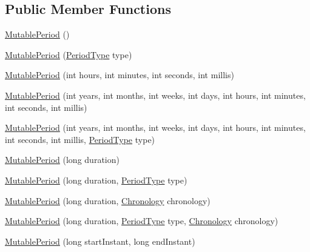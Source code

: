 \subsection*{Public Member Functions}
\begin{DoxyCompactItemize}
\item 
\hyperlink{classorg_1_1joda_1_1time_1_1_mutable_period_ad3e7fe2eb90d73aa1ce10e2feaebd445}{Mutable\-Period} ()
\item 
\hyperlink{classorg_1_1joda_1_1time_1_1_mutable_period_abecb6476e8d11e3e1440523c368b28ea}{Mutable\-Period} (\hyperlink{classorg_1_1joda_1_1time_1_1_period_type}{Period\-Type} type)
\item 
\hyperlink{classorg_1_1joda_1_1time_1_1_mutable_period_a5eeb00283fbb87e60884817c2292960e}{Mutable\-Period} (int hours, int minutes, int seconds, int millis)
\item 
\hyperlink{classorg_1_1joda_1_1time_1_1_mutable_period_a32f46105df3922db8a855eeca4c6d610}{Mutable\-Period} (int years, int months, int weeks, int days, int hours, int minutes, int seconds, int millis)
\item 
\hyperlink{classorg_1_1joda_1_1time_1_1_mutable_period_ad79a05f881b02603a48f7b2f5dd46c9f}{Mutable\-Period} (int years, int months, int weeks, int days, int hours, int minutes, int seconds, int millis, \hyperlink{classorg_1_1joda_1_1time_1_1_period_type}{Period\-Type} type)
\item 
\hyperlink{classorg_1_1joda_1_1time_1_1_mutable_period_ac6c5a661087a85d644b159ff1b35b506}{Mutable\-Period} (long duration)
\item 
\hyperlink{classorg_1_1joda_1_1time_1_1_mutable_period_a1681bfed774d95484a41c5a90596ced3}{Mutable\-Period} (long duration, \hyperlink{classorg_1_1joda_1_1time_1_1_period_type}{Period\-Type} type)
\item 
\hyperlink{classorg_1_1joda_1_1time_1_1_mutable_period_a5efeaab986ee2cbccec24423125d1fd5}{Mutable\-Period} (long duration, \hyperlink{classorg_1_1joda_1_1time_1_1_chronology}{Chronology} chronology)
\item 
\hyperlink{classorg_1_1joda_1_1time_1_1_mutable_period_a192de40bf57a710debce2cd505f92e3b}{Mutable\-Period} (long duration, \hyperlink{classorg_1_1joda_1_1time_1_1_period_type}{Period\-Type} type, \hyperlink{classorg_1_1joda_1_1time_1_1_chronology}{Chronology} chronology)
\item 
\hyperlink{classorg_1_1joda_1_1time_1_1_mutable_period_a2c42ece0f06bb153b4e6139d34e5b27e}{Mutable\-Period} (long start\-Instant, long end\-Instant)
\item 

\end{DoxyCompactItemize}
